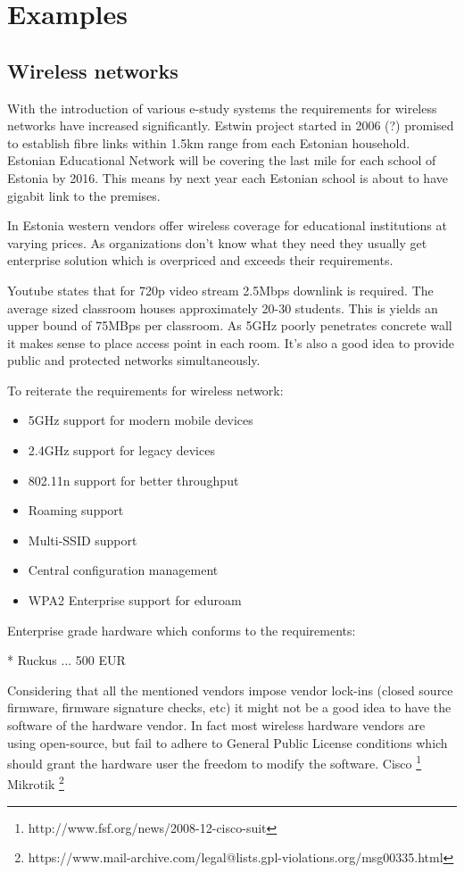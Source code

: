\documentclass{article}
\begin{document}
\section{Examples}

\subsection{Wireless networks}

With the introduction of various e-study systems the requirements for
wireless networks have increased significantly.
Estwin project started in 2006 (?) promised to establish fibre links within 1.5km range
from each Estonian household.
Estonian Educational Network will be covering the last mile for each school of Estonia
by 2016.
This means by next year each Estonian school is about to have gigabit link to the premises.

In Estonia western vendors offer wireless coverage for educational institutions
at varying prices.
As organizations don't know what they need they usually get enterprise solution which
is overpriced and exceeds their requirements.

Youtube states
that for 720p video stream 2.5Mbps downlink is required.
The average sized classroom houses approximately 20-30 students.
This is yields an upper bound of 75MBps per classroom.
As 5GHz poorly penetrates concrete wall it makes sense to place
access point in each room.
It's also a good idea to provide public and protected networks
simultaneously.

To reiterate the requirements for wireless network:

\begin{itemize}

  \item{5GHz support for modern mobile devices}
  \item{2.4GHz support for legacy devices}
  \item{802.11n support for better throughput}
  \item{Roaming support}
  \item{Multi-SSID support}
  \item{Central configuration management}
  \item{WPA2 Enterprise support for eduroam}
\end{itemize}
Enterprise grade hardware which conforms to the requirements:

* Ruckus ... 500 EUR


Considering that all the mentioned vendors impose vendor lock-ins
(closed source firmware, firmware signature checks, etc)
it might not be a good idea to have the software of the hardware vendor.
In fact most wireless hardware vendors are using open-source, but
fail to adhere to General Public License conditions which should grant
the hardware user the freedom to modify the software.
Cisco \footnote{http://www.fsf.org/news/2008-12-cisco-suit}
Mikrotik \footnote{https://www.mail-archive.com/legal@lists.gpl-violations.org/msg00335.html}
\end{document}
